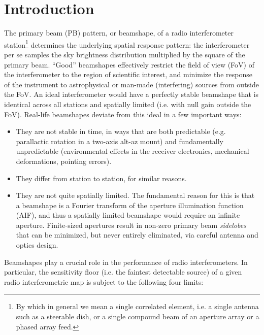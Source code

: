 \documentclass{aa}
\begin{document}

\maketitle

\section{Introduction}

The primary beam (PB) pattern, or beamshape, of a radio interferometer station\footnote{By which in general we mean a single correlated element, i.e. a single antenna such as a steerable dish, or a single compound beam of an aperture array or a phased array feed.} determines the underlying spatial response pattern: the interferometer per se samples the sky brightness distribution multiplied by the square of the primary beam. ``Good'' beamshapes effectively restrict the field of view (FoV) of the interferometer to the region of scientific interest, and minimize the response of the instrument to astrophysical or man-made (interfering) sources from outside the FoV. An ideal interferometer would have a perfectly stable beamshape that is identical across all stations and spatially limited (i.e. with null gain outside the FoV). Real-life beamshapes deviate from this ideal in a few important ways:

\begin{itemize}
\item They are not stable in time, in ways that are both predictable (e.g. parallactic rotation in a two-axis alt-az mount) and fundamentally unpredictable (environmental effects in the receiver electronics, mechanical deformations, pointing errors).
\item They differ from station to station, for similar reasons.
\item They are not quite spatially limited. The fundamental reason for this is that a beamshape is a Fourier transform of the aperture illumination function (AIF), and thus a spatially limited beamshape would require an infinite aperture. Finite-sized apertures result in non-zero primary beam \emph{sidelobes} that can be minimized, but never entirely eliminated, via careful antenna and optics design.
\end{itemize}

Beamshapes play a crucial role in the performance of radio interferometers. In particular, the sensitivity floor (i.e. the faintest detectable source) of a given radio interferometric map is subject to the following four limits:
\end{document}
